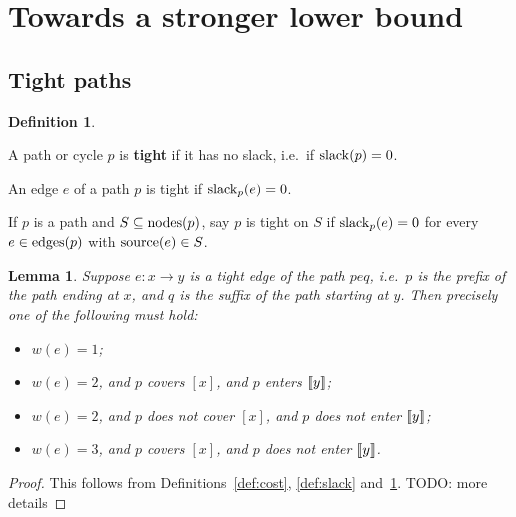 \documentclass[a4paper]{article}
\newtheorem{lemma}{Lemma}
\theoremstyle{definition}
\newtheorem{defn}{Definition}[section]
\theoremstyle{remark}
\let\definiendum\textbf
\begin{document}
\section{Towards a stronger lower bound}\label{s:stronger}
\subsection{Tight paths}

\begin{defn}\label{def:tight}
    \item A path or cycle $p$ is \definiendum{tight} if it has no slack, i.e.\ if $\mathrm{slack}(p)=0$.
    \item An edge $e$ of a path $p$ is tight if $\mathrm{slack}_p(e)=0$.
    \item If $p$ is a path and $S\subseteq\mathrm{nodes}(p)$, say $p$ is tight on $S$ if $\mathrm{slack}_p(e)=0$ for every $e\in\mathrm{edges}(p)$ with $\mathrm{source}(e)\in S$.
\end{defn}

\begin{lemma}\label{lem:tight-char}
    Suppose $e: x\to y$ is a tight edge of the path $peq$, i.e.\ $p$ is the prefix of the path ending at $x$, and $q$ is the suffix of the path starting at $y$. Then precisely one of the following must hold:
    \begin{itemize}
        \item $w(e)=1$;
        \item $w(e)=2$, and $p$ covers $[x]$, and $p$ enters $\llbracket y\rrbracket$;
        \item $w(e)=2$, and $p$ does not cover $[x]$, and $p$ does not enter $\llbracket y\rrbracket$;
        \item $w(e)=3$, and $p$ covers $[x]$, and $p$ does not enter $\llbracket y\rrbracket$.
    \end{itemize}
\end{lemma}
\begin{proof}
    This follows from Definitions~\ref{def:cost}, \ref{def:slack} and~\ref{def:tight}.
    TODO: more details
\end{proof}
\end{document}
